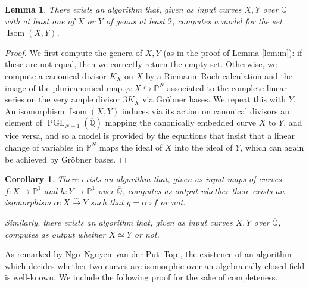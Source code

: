 \documentclass{amsproc}
\numberwithin{equation}{section}
\numberwithin{figure}{section}
\newtheorem{lemma}[equation]{Lemma}
\newtheorem{corollary}[equation]{Corollary}
\theoremstyle{definition}
\theoremstyle{remark}
\DeclareMathOperator{\PGL}{PGL}
\DeclareMathOperator{\Isom}{Isom}
\newcommand{\Qbar}{\overline{\mathbb{Q}}}
\newcommand\PP{\mathbb{P}}
\begin{document}
 \begin{lemma}\label{lemma:alg_for_isoms0}
 There exists an algorithm that, given as input curves $X,Y$ over $\Qbar$ with at least one of $X$ or $Y$ of  genus at least $2$, computes a model for the set $\Isom(X,Y)$.
 \end{lemma}
 
  
 \begin{proof} 
 We first compute the genera of $X,Y$ (as in the proof of Lemma \ref{lem:m}): if these are not equal, then we correctly return the empty set.  Otherwise, we compute a canonical divisor $K_X$ on $X$ by a Riemann--Roch calculation \cite{Hess} and the image of the pluricanonical map $\varphi\colon X \hookrightarrow \PP^N$ associated to the complete linear series on the very ample divisor $3K_X$ via Gr\"obner bases.  We repeat this with $Y$.  An isomorphism $\Isom(X,Y)$ induces via its action on canonical divisors an element of $\PGL_{N-1}(\Qbar)$ mapping the canonically embedded curve $X$ to $Y$, and vice versa, and so a model is provided by the equations that insist that a linear change of variables in $\PP^N$ maps the ideal of $X$ into the ideal of $Y$, which can again be achieved by Gr\"obner bases.
 \end{proof}
 

\begin{corollary} \label{cor:alg_for_isoms}
There exists an algorithm that, given as input maps of curves $f\colon X \to \PP^1$ and $h\colon Y \to \PP^1$ over $\Qbar$, computes as output whether there exists an isomorphism $\alpha\colon X \xrightarrow{\sim} Y$ such that $g=\alpha \circ f$ or not.

Similarly, there exists an algorithm that, given as input curves $X,Y$ over $\Qbar$, computes as output whether $X \simeq Y$ or not.
\end{corollary}

As remarked by Ngo--Nguyen--van der Put--Top \cite[Appendix]{Ngoetal}, the existence of an algorithm which decides whether two curves are isomorphic over an algebraically closed field is well-known. We include the following proof for the sake of completeness.
\end{document}
